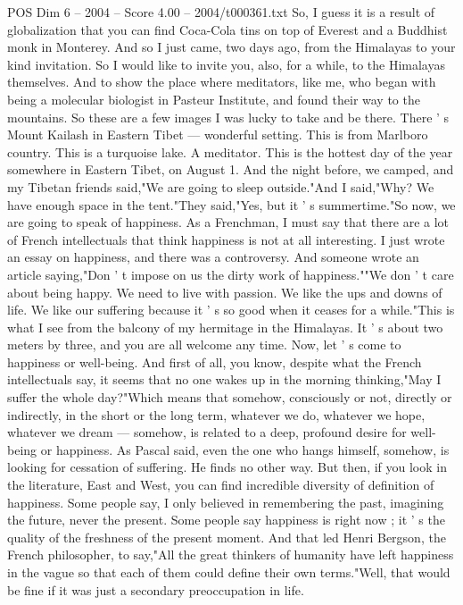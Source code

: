 \begin{textsample}{POS Dim 6 – 2004 – Score 4.00 – 2004/t000361.txt}  \label{ex:f6_pos_027}
So, I guess it is a result of globalization that you can find Coca-Cola tins on top of Everest and a Buddhist monk in Monterey.
And so I just came, two days ago, from the Himalayas to your kind invitation.
So I would like to invite you, also, for a while, to the Himalayas themselves.
And to show the place where meditators, like me, who began with being a molecular biologist in Pasteur Institute, and found their way to the mountains.
So these are a few images I was lucky to take and be there.
There ' s Mount Kailash in Eastern Tibet — wonderful setting.
This is from Marlboro country.
This is a turquoise lake.
A meditator.
This is the hottest day of the year somewhere in Eastern Tibet, on August 1.
And the night before, we camped, and my Tibetan friends said,"We are going to sleep outside."And I said,"Why?
We have enough space in the tent."They said,"Yes, but it ' s summertime."So now, we are going to speak of happiness.
As a Frenchman, I must say that there are a lot of French intellectuals that think happiness is not at all interesting.
I just wrote an essay on happiness, and there was a controversy.
And someone wrote an article saying,"Don ' t impose on us the dirty work of happiness.""We don ' t care about being happy.
We need to live with passion.
We like the ups and downs of life.
We like our suffering because it ' s so good when it ceases for a while."This is what I see from the balcony of my hermitage in the Himalayas.
It ' s about two meters by three, and you are all welcome any time.
Now, let ' s come to happiness or well-being.
And first of all, you know, despite what the French intellectuals say, it seems that no one wakes up in the morning thinking,"May I suffer the whole day?"Which means that somehow, consciously or not, directly or indirectly, in the short or the long term, whatever we do, whatever we hope, whatever we dream — somehow, is related to a deep, profound desire for well-being or happiness.
As Pascal said, even the one who hangs himself, somehow, is looking for cessation of suffering.
He finds no other way.
But then, if you look in the literature, East and West, you can find incredible diversity of definition of happiness.
Some people say, I only believed in remembering the past, imagining the future, never the present.
Some people say happiness is right now ; it ' s the quality of the freshness of the present moment.
And that led Henri Bergson, the French philosopher, to say,"All the great thinkers of humanity have left happiness in the vague so that each of them could define their own terms."Well, that would be fine if it was just a secondary preoccupation in life.

\end{textsample}
